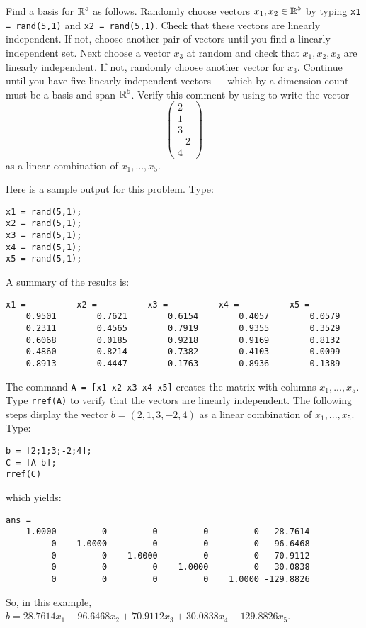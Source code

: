 \documentclass{ximera}
\begin{document}
\begin{exercise} \label{c5.6.5}
Find a basis for $\mbox{$\Bbb{R}$}^5$ as follows.  Randomly choose vectors $x_1,x_2\in\mbox{$\Bbb{R}$}^5$
by typing {\tt x1 = rand(5,1)} and {\tt x2 = rand(5,1)}.  Check that these
vectors are linearly independent.  If not, choose another pair of vectors
until you find a linearly independent set.  Next choose a vector $x_3$ at
random and check that $x_1,x_2,x_3$ are linearly independent.  If not,
randomly choose another vector for $x_3$. Continue until you have five
linearly independent vectors --- which by a dimension count must be a
basis and span $\mbox{$\Bbb{R}$}^5$.  Verify this comment by using \Matlab
to write the vector
\[
\left(\begin{array}{r} 2 \\ 1 \\ 3\\ -2 \\ 4 \end{array}\right)
\]
as a linear combination of $x_1,\ldots,x_5$.

\begin{solution}

Here is a sample \Matlab output for this problem.  Type:
\begin{verbatim}
x1 = rand(5,1);
x2 = rand(5,1);
x3 = rand(5,1);
x4 = rand(5,1);
x5 = rand(5,1);
\end{verbatim}
A summary of the results is:
\begin{verbatim}
x1 =          x2 =          x3 =          x4 =          x5 =
    0.9501        0.7621        0.6154        0.4057        0.0579
    0.2311        0.4565        0.7919        0.9355        0.3529
    0.6068        0.0185        0.9218        0.9169        0.8132
    0.4860        0.8214        0.7382        0.4103        0.0099
    0.8913        0.4447        0.1763        0.8936        0.1389
\end{verbatim}
The command {\tt A = [x1 x2 x3 x4 x5]} creates the matrix with columns
$x_1,...,x_5$.  Type {\tt rref(A)} to verify that the vectors are
linearly independent.  The following steps display the vector
$b = (2,1,3,-2,4)$ as a linear combination of $x_1,...,x_5$.  Type:
\begin{verbatim}
b = [2;1;3;-2;4];
C = [A b];
rref(C)
\end{verbatim}
which yields:

\begin{verbatim}
ans =
    1.0000         0         0         0         0   28.7614
         0    1.0000         0         0         0  -96.6468
         0         0    1.0000         0         0   70.9112
         0         0         0    1.0000         0   30.0838
         0         0         0         0    1.0000 -129.8826
\end{verbatim}
So, in this example, $b = 28.7614x_1 - 96.6468x_2 + 70.9112x_3
+ 30.0838x_4 - 129.8826x_5$.

\end{solution}
\end{exercise}
\end{document}
